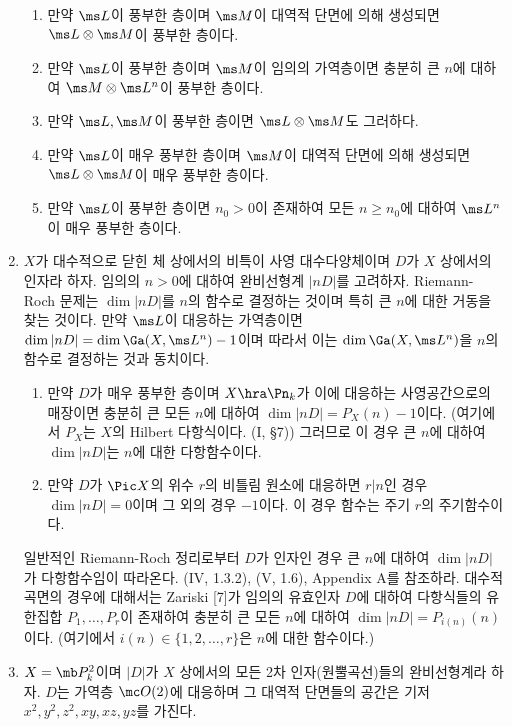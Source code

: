 \begin{enumerate}[label=\tb{7.\arabic*.},itemindent=0mm,itemsep=2mm]
	\begin{enumerate}[label=(\alph*)]
	\item 만약 $\ms L$이 풍부한 층이며 $\ms M$이 대역적 단면에 의해 생성되면 $\ms L\otimes\ms M$이 풍부한 층이다.
	\item 만약 $\ms L$이 풍부한 층이며 $\ms M$이 임의의 가역층이면 충분히 큰 $n$에 대하여 $\ms M\otimes\ms L^n$이 풍부한 층이다.
	\item 만약 $\ms L,\ms M$이 풍부한 층이면 $\ms L\otimes\ms M$도 그러하다.
	\item 만약 $\ms L$이 매우 풍부한 층이며 $\ms M$이 대역적 단면에 의해 생성되면 $\ms L\otimes\ms M$이 매우 풍부한 층이다.
	\item 만약 $\ms L$이 풍부한 층이면 $n_0>0$이 존재하여 모든 $n\ge n_0$에 대하여 $\ms L^n$이 매우 풍부한 층이다.
	\end{enumerate}
	\item {} $X$가 대수적으로 닫힌 체 상에서의 비특이 사영 대수다양체이며 $D$가 $X$ 상에서의 인자라 하자.
	임의의 $n>0$에 대하여 완비선형계 $|nD|$를 고려하자.
	Riemann-Roch 문제는 $\dim|nD|$를 $n$의 함수로 결정하는 것이며 특히 큰 $n$에 대한 거동을 찾는 것이다.
	만약 $\ms L$이 대응하는 가역층이면 $\dim|nD|=\dim\Ga(X,\ms L^n)-1$이며
	따라서 이는 $\dim\Ga(X,\ms L^n)$을 $n$의 함수로 결정하는 것과 동치이다.
	\begin{enumerate}[label=(\alph*)]
	\item 만약 $D$가 매우 풍부한 층이며 $X\hra\Pn_k$가 이에 대응하는 사영공간으로의 매장이면 충분히 큰 모든 $n$에 대하여
	$\dim|nD|=P_X(n)-1$이다. (여기에서 $P_X$는 $X$의 Hilbert 다항식이다. (I, \S 7))
	그러므로 이 경우 큰 $n$에 대하여 $\dim|nD|$는 $n$에 대한 다항함수이다.
	\item 만약 $D$가 $\Pic X$의 위수 $r$의 비틀림 원소에 대응하면 $r|n$인 경우 $\dim|nD|=0$이며 그 외의 경우 $-1$이다.
	이 경우 함수는 주기 $r$의 주기함수이다.
	\end{enumerate}
	일반적인 Riemann-Roch 정리로부터 $D$가  인자인 경우 큰 $n$에 대하여 $\dim|nD|$가 다항함수임이 따라온다.
	(IV, 1.3.2), (V, 1.6), Appendix A를 참조하라. 대수적 곡면의 경우에 대해서는 Zariski [7]가 임의의 유효인자 $D$에 대하여
	다항식들의 유한집합 $P_1,\ldots,P_r$이 존재하여 충분히 큰 모든 $n$에 대하여 $\dim|nD|=P_{i(n)}(n)$이다.
	(여기에서 $i(n)\in\{1,2,\ldots,r\}$은 $n$에 대한 함수이다.)
	\item{} $X=\mb P_k^2$이며 $|D|$가 $X$ 상에서의 모든 2차 인자(원뿔곡선)들의 완비선형계라 하자.
	$D$는 가역층 $\mc O(2)$에 대응하며 그 대역적 단면들의 공간은 기저 $x^2,y^2,z^2,xy,xz,yz$를 가진다.

\end{enumerate}
